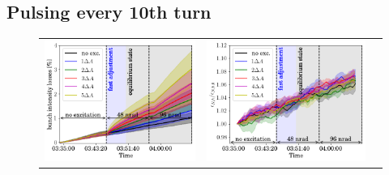 \documentclass[aps
,prstab
,reprint
,longbibliography
,preprintnumbers
,showkeys
,amsfonts,amssymb,amsmath
,floatfix
]{revtex4-1}
\newlength{\thirdwidth}
\begin{document}
\subsection{Pulsing every 10th turn}
\label{sec:simex10}


\begin{figure}
  \begin{tabular}{ccc}
    \includegraphics[width=\thirdwidth]{2016_bunch_intensity_v10th_no_damper_avg.png}&
    \includegraphics[width=\thirdwidth]{2016_emith_avg_rel_v10th_no_damper.png}&

\end{tabular}
\end{figure}
\end{document}
